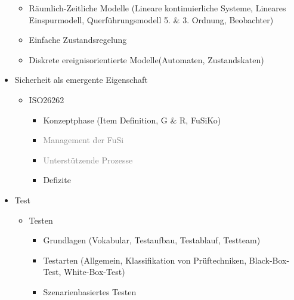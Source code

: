 \begin{itemize}
\begin{itemize}
              \item R\"aumlich-Zeitliche Modelle (Lineare kontinuierliche Systeme, Lineares Einspurmodell, Querf\"uhrungsmodell 5. \& 3. Ordnung, Beobachter)
              \item Einfache Zustandsregelung
              \item Diskrete ereignisorientierte Modelle(Automaten, Zustandskaten)
          \end{itemize}
    \item Sicherheit als emergente Eigenschaft\begin{itemize}
        \item ISO26262\begin{itemize}
            \item Konzeptphase (Item Definition, G \& R, FuSiKo)
            \item \textcolor{gray}{Management der FuSi}
            \item \textcolor{gray}{Unterstützende Prozesse}
            \item Defizite
        \end{itemize}
    \end{itemize}
    \item Test\begin{itemize}
        \item Testen\begin{itemize}
            \item Grundlagen (Vokabular, Testaufbau, Testablauf, Testteam)
            \item Testarten (Allgemein, Klassifikation von Prüftechniken, Black-Box-Test, White-Box-Test)
            \item Szenarienbasiertes Testen
        \end{itemize}
    \end{itemize}
\end{itemize}

